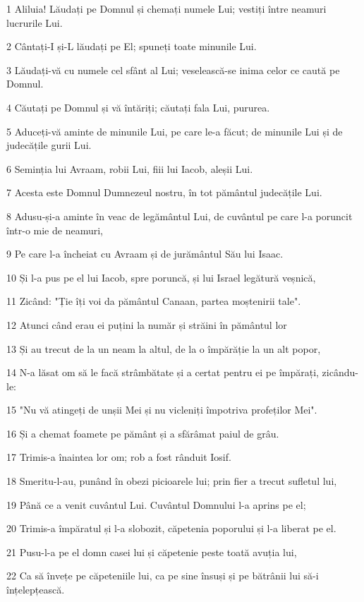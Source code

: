 \par 1 Aliluia! Lăudați pe Domnul și chemați numele Lui; vestiți între neamuri lucrurile Lui.
\par 2 Cântați-I și-L lăudați pe El; spuneți toate minunile Lui.
\par 3 Lăudați-vă cu numele cel sfânt al Lui; veselească-se inima celor ce caută pe Domnul.
\par 4 Căutați pe Domnul și vă întăriți; căutați fala Lui, pururea.
\par 5 Aduceți-vă aminte de minunile Lui, pe care le-a făcut; de minunile Lui și de judecățile gurii Lui.
\par 6 Seminția lui Avraam, robii Lui, fiii lui Iacob, aleșii Lui.
\par 7 Acesta este Domnul Dumnezeul nostru, în tot pământul judecățile Lui.
\par 8 Adusu-și-a aminte în veac de legământul Lui, de cuvântul pe care l-a poruncit într-o mie de neamuri,
\par 9 Pe care l-a încheiat cu Avraam și de jurământul Său lui Isaac.
\par 10 Și l-a pus pe el lui Iacob, spre poruncă, și lui Israel legătură veșnică,
\par 11 Zicând: "Ție îți voi da pământul Canaan, partea moștenirii tale".
\par 12 Atunci când erau ei puțini la număr și străini în pământul lor
\par 13 Și au trecut de la un neam la altul, de la o împărăție la un alt popor,
\par 14 N-a lăsat om să le facă strâmbătate și a certat pentru ei pe împărați, zicându-le:
\par 15 "Nu vă atingeți de unșii Mei și nu vicleniți împotriva profeților Mei".
\par 16 Și a chemat foamete pe pământ și a sfărâmat paiul de grâu.
\par 17 Trimis-a înaintea lor om; rob a fost rânduit Iosif.
\par 18 Smeritu-l-au, punând în obezi picioarele lui; prin fier a trecut sufletul lui,
\par 19 Până ce a venit cuvântul Lui. Cuvântul Domnului l-a aprins pe el;
\par 20 Trimis-a împăratul și l-a slobozit, căpetenia poporului și l-a liberat pe el.
\par 21 Pusu-l-a pe el domn casei lui și căpetenie peste toată avuția lui,
\par 22 Ca să învețe pe căpeteniile lui, ca pe sine însuși și pe bătrânii lui să-i înțelepțească.
